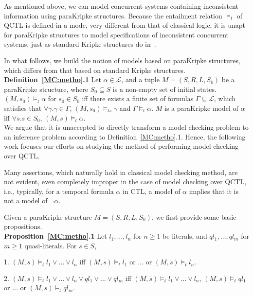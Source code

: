 \documentclass{entcs}
\begin{document}
As mentioned above, we can model concurrent systems containing
inconsistent information using paraKripke structures. Because the
entailment relation $\models_t$ of QCTL is defined in a mode, very
different from that of classical logic, it is unapt for paraKripke
structures to model specifications of inconsistent concurrent
systems, just as standard Kripke structures do in~\cite{MC,TL}.

In what follows, we build the notion of models based on paraKripke
structures, which differs from that based on standard Kripke structures.\\

\noindent\textbf{Definition~\ref{MC:metho}.1} Let
 $\alpha\in\mathcal{L}$, and a tuple $M=(S,R,L,S_0)$ be a paraKripke
 structure, where $S_0\subseteq S$ is a non-empty set of initial
 states. $(M,s_0)\models_t\alpha$ for $s_0\in S_0$ iff there
 exists a finite set of formulas $\Gamma\subseteq\mathcal{L}$,
 which satisfies that $\forall\gamma.\gamma\in\Gamma$,
 $(M,s_0)\models_{ts}\gamma$ and $\Gamma\models_t\alpha$. $M$ is a
 paraKripke model of $\alpha$ iff $\forall s.s\in S_0$,
 $(M,s)\models_t\alpha$.\\

 We argue that it is unaccepted to directly transform a model checking
problem to an inference problem according to
Definition~\ref{MC:metho}.1. Hence, the following work focuses our
efforts on studying the method of performing model checking over
QCTL.

Many assertions, which naturally hold in classical model checking
method, are not evident, even completely improper in the case of
model checking over QCTL, i.e., typically, for a temporal formula
$\alpha$ in CTL, a model of $\alpha$ implies that it is not a
model of $\neg\alpha$.

Given a paraKripke structure $M=(S,R,L,S_0)$, we first provide
some basic propositions.\\

\noindent\textbf{Proposition~\ref{MC:metho}.1} Let
$l_1,\ldots,l_n$ for $n\geq 1$ be literals, and $ql_1,\ldots,ql_m$
for $m\geq 1$ quasi-literals. For $s\in S$,

1. $(M,s)\models_t l_1\vee\ldots\vee l_n $ iff $(M,s)\models_t
l_1$ or $\ldots$ or $(M,s)\models_t l_n$.

2. $(M,s)\models_t l_1\vee\ldots\vee l_n\vee ql_1\vee\ldots\vee
ql_m$ iff $(M,s)\models_t l_1\vee\ldots\vee l_n$, $(M,s)\models_t
ql_1$ or $\ldots$ or $(M,s)\models_t ql_m$.\\
\end{document}
